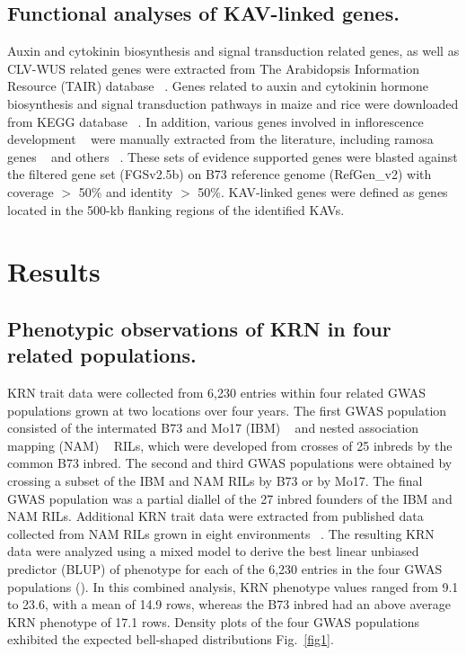 \documentclass[10pt,letterpaper]{article}
\begin{document}
\subsection*{Functional analyses of KAV-linked genes.} 
Auxin and cytokinin biosynthesis and signal transduction related genes, as well as CLV-WUS related genes were extracted from The Arabidopsis Information Resource (TAIR) database ~\cite{Poole2007}. Genes related to auxin and cytokinin hormone biosynthesis and signal transduction pathways in maize and rice were downloaded from KEGG database ~\cite{Kanehisa2002}. In addition, various genes involved in inflorescence development ~\cite{Barazesh2008} were manually extracted from the literature, including ramosa genes ~\cite{Bortiri2006} and others ~\cite{McSteen2001, Upadyayula2006, Xu2011}. These sets of evidence supported genes were blasted against the filtered gene set (FGSv2.5b) on B73 reference genome (RefGen\_v2) with coverage $>$ 50\% and identity $>$ 50\%. KAV-linked genes were defined as genes located in the 500-kb flanking regions of the identified KAVs.


\section*{Results}
\subsection*{Phenotypic observations of KRN in four related populations.}

KRN trait data were collected from 6,230 entries within four related GWAS populations grown at two locations over four years. The first GWAS population consisted of the intermated B73 and Mo17 (IBM) ~\cite{Lee2002} and nested association mapping (NAM) ~\cite{Yu2008} RILs, which were developed from crosses of 25 inbreds by the common B73 inbred. The second and third GWAS populations were obtained by crossing a subset of the IBM and NAM RILs by B73 or by Mo17.  The final GWAS population was a partial diallel of the 27 inbred founders of the IBM and NAM RILs. Additional KRN trait data were extracted from published data collected from NAM RILs grown in eight environments ~\cite{Brown2011}. The resulting KRN data were analyzed using a mixed model to derive the best linear unbiased predictor (BLUP) of phenotype for each of the 6,230 entries in the four GWAS populations (). In this combined analysis, KRN phenotype values ranged from 9.1 to 23.6, with a mean of 14.9 rows, whereas the B73 inbred had an above average KRN phenotype of 17.1 rows. Density plots of the four GWAS populations exhibited the expected bell-shaped distributions Fig.~\ref{fig1}.
\end{document}
